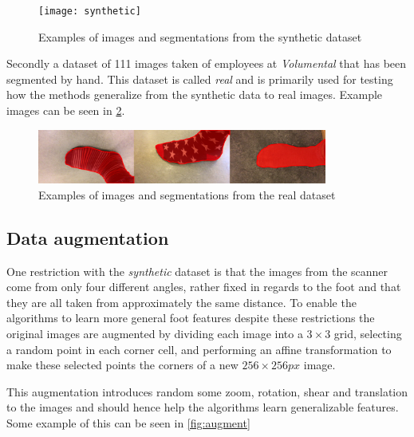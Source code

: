 \documentclass{kththesis}
\begin{document}
\begin{figure}[h]
  \centering
  \texttt{[image: synthetic]}
  \caption{Examples of images and segmentations from the synthetic dataset}
  \label{fig:data_synthetic}
\end{figure}

Secondly a dataset of 111 images taken of employees at \textit{Volumental} that
has been segmented by hand. This dataset is called \textit{real} and is
primarily used for testing how the methods generalize from  the synthetic data to
real images. Example images can be seen in \cref{fig:data_real}.

\begin{figure}[h]
  \centering
  \includegraphics[width=0.85\textwidth]{real}
  \caption{Examples of images and segmentations from the real dataset}
  \label{fig:data_real}
\end{figure}

\subsection{Data augmentation}
One restriction with the \textit{synthetic} dataset is that the images from the
scanner come from only four different angles, rather fixed in regards to the
foot and that they are all taken from approximately the same
distance. To enable the algorithms to learn more general foot features despite
these restrictions the original images are augmented by dividing each image into
a \(3\times3\) grid, selecting a random point in each corner cell, and
performing an affine transformation to make these selected points the corners of
a new \(256\times256 \textit{px}\) image.

This augmentation introduces random some zoom, rotation, shear and translation
to the images and should hence help the algorithms learn generalizable features.
Some example of this can be seen in \cref{fig:augment}
\end{document}

